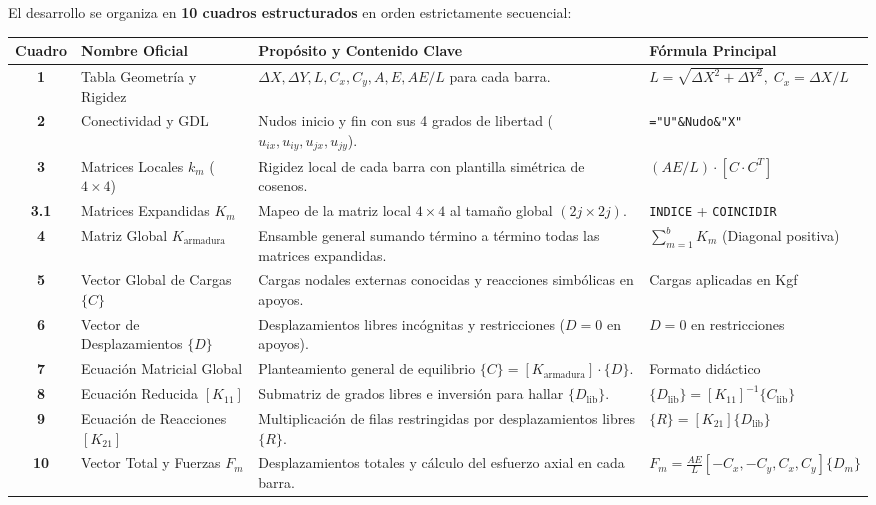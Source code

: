 \documentclass[10pt,a4paper]{article}
\begin{document}
El desarrollo se organiza en \textbf{10 cuadros estructurados} en orden estrictamente secuencial:

\begin{center}
\small
\begin{tabularx}{\textwidth}{c l X l}
\toprule
\textbf{Cuadro} & \textbf{Nombre Oficial} & \textbf{Propósito y Contenido Clave} & \textbf{Fórmula Principal} \\
\midrule
\textbf{1} & Tabla Geometría y Rigidez & $\Delta X, \Delta Y, L, C_x, C_y, A, E, AE/L$ para cada barra. & $L=\sqrt{\Delta X^2+\Delta Y^2},\; C_x=\Delta X/L$ \\
\textbf{2} & Conectividad y GDL & Nudos inicio y fin con sus 4 grados de libertad ($u_{ix}, u_{iy}, u_{jx}, u_{jy}$). & \texttt{="U"\&Nudo\&"X"} \\
\textbf{3} & Matrices Locales $k_m$ ($4\times 4$) & Rigidez local de cada barra con plantilla simétrica de cosenos. & $(AE/L) \cdot [C \cdot C^T]$ \\
\textbf{3.1} & Matrices Expandidas $K_m$ & Mapeo de la matriz local $4\times 4$ al tamaño global $(2j \times 2j)$. & \texttt{INDICE} + \texttt{COINCIDIR} \\
\textbf{4} & Matriz Global $K_{\text{armadura}}$ & Ensamble general sumando término a término todas las matrices expandidas. & $\sum_{m=1}^b K_m$ (Diagonal positiva) \\
\textbf{5} & Vector Global de Cargas $\{C\}$ & Cargas nodales externas conocidas y reacciones simbólicas en apoyos. & Cargas aplicadas en Kgf \\
\textbf{6} & Vector de Desplazamientos $\{D\}$ & Desplazamientos libres incógnitas y restricciones ($D=0$ en apoyos). & $D=0$ en restricciones \\
\textbf{7} & Ecuación Matricial Global & Planteamiento general de equilibrio $\{C\} = [K_{\text{armadura}}] \cdot \{D\}$. & Formato didáctico \\
\textbf{8} & Ecuación Reducida $[K_{11}]$ & Submatriz de grados libres e inversión para hallar $\{D_{\text{lib}}\}$. & $\{D_{\text{lib}}\} = [K_{11}]^{-1} \{C_{\text{lib}}\}$ \\
\textbf{9} & Ecuación de Reacciones $[K_{21}]$ & Multiplicación de filas restringidas por desplazamientos libres $\{R\}$. & $\{R\} = [K_{21}] \{D_{\text{lib}}\}$ \\
\textbf{10} & Vector Total y Fuerzas $F_m$ & Desplazamientos totales y cálculo del esfuerzo axial en cada barra. & $F_m = \frac{AE}{L} [-C_x, -C_y, C_x, C_y] \{D_m\}$ \\
\bottomrule
\end{tabularx}
\end{center}
\end{document}
